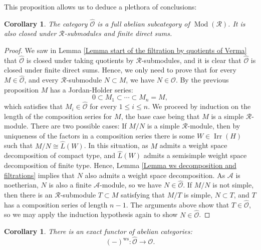 \documentclass{amsart}
\newtheorem{coro}[defi]{Corollary}
\newcommand{\Mod}{\operatorname{Mod}}
\newcommand{\OX}{\mathcal{O}}
\begin{document}
This proposition allows us to deduce a plethora of conclusions:
\begin{coro}\label{coro analytic OX is abelian}
The category $\widehat{\OX}$ is a full abelian subcategory of $\Mod(\mathscr{R})$. It is also closed under $\mathscr{R}$-submodules and finite direct sums.
\end{coro}
\begin{proof}
We saw in Lemma \ref{Lemma start of the filtration by quotients of Verma} that $\widehat{\OX}$ is closed under taking quotients by $\mathscr{R}$-submodules, and it is clear that $\widehat{\OX}$ is closed under finite direct sums. Hence, we only need to prove that for every $M\in \widehat{\OX}$, and every $\mathscr{R}$-submodule $N\subset M$, we have $N\in \widehat{\OX}$. By the previous proposition $M$ has a Jordan-Holder series:
\begin{equation*}
   0\subset M_1\subset \cdots\subset M_n=M, 
\end{equation*}
which satisfies that $M_i\in \widehat{\OX}$ for every $1\leq i \leq n$. We proceed by induction on the length of the composition series for $M$, the base case being that $M$ is a simple $\mathscr{R}$-module. There are two possible cases: If $M/N$ is a simple $\mathscr{R}$-module, then by uniqueness of the factors in a composition series there is some $W\in \operatorname{Irr}(H)$ such that $M/N\cong \widehat{L}(W)$. In this situation, as $M$ admits a weight space decomposition of compact type, and  $\widehat{L}(W)$ admits a semisimple weight space decomposition of finite type. Hence, Lemma \ref{Lemma ws decomposition and filtrations} implies that $N$ also admits a weight space decomposition. As $\mathscr{A}$ is noetherian, $N$ is also a finite $\mathscr{A}$-module, so we have $N\in \widehat{\OX}$. If $M/N$ is not simple, then there is an $\mathscr{R}$-submodule $T\subset M$ satisfying that $M/T$ is simple, $N\subset T$, and $T$ has a composition series of length $n-1$. The arguments above show that $T\in \widehat{\OX}$, so we may apply the induction hypothesis again to show $N\in \widehat{\OX}$.
\end{proof}
\begin{coro}\label{coro ws is well-defined}
There is an exact functor of abelian categories:
\begin{equation*}
    (-)^{\operatorname{ws}}:\widehat{\OX}\rightarrow \OX.
\end{equation*}
\end{coro}
\end{document}
